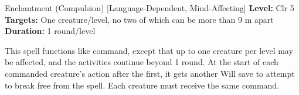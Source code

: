 {Enchantment (Compulsion) [Language-Dependent, Mind-Affecting]}
{
	\textbf{Level:}
	Clr 5\\
	\textbf{Targets:}
	One creature/level, no two of which can be more than 9 m apart\\
	\textbf{Duration:}
	1 round/level\\
}
{
	This spell functions like command, except that up to one creature per level may be affected, and the activities continue beyond 1 round. At the start of each commanded creature's action after the first, it gets another Will save to attempt to break free from the spell. Each creature must receive the same command.

}
